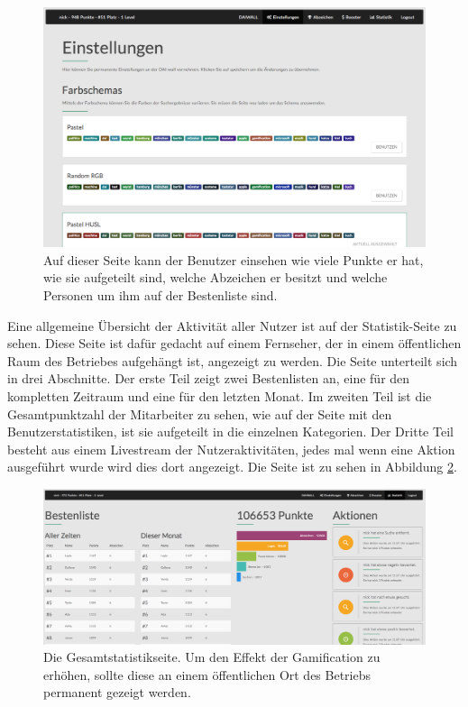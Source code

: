 \documentclass[12pt,twoside]{book}
\begin{document}
\begin{figure}[htbp]
    \centering
    \includegraphics[width=1.0\textwidth]{images/infoboard_settings.png}
    \caption{Auf dieser Seite kann der Benutzer einsehen wie viele Punkte er hat, wie sie aufgeteilt sind, welche Abzeichen er besitzt und welche Personen um ihm auf der Bestenliste sind.}
    \label{fig:settings}
\end{figure}

Eine allgemeine Übersicht der Aktivität aller Nutzer ist auf der Statistik-Seite zu sehen. Diese Seite ist dafür gedacht auf einem Fernseher, der in einem öffentlichen Raum des Betriebes aufgehängt ist, angezeigt zu werden. Die Seite unterteilt sich in drei Abschnitte. Der erste Teil zeigt zwei Bestenlisten an, eine für den kompletten Zeitraum und eine für den letzten Monat. Im zweiten Teil ist die Gesamtpunktzahl der Mitarbeiter zu sehen, wie auf der Seite mit den Benutzerstatistiken, ist sie aufgeteilt in die einzelnen Kategorien. Der Dritte Teil besteht aus einem Livestream der Nutzeraktivitäten, jedes mal wenn eine Aktion ausgeführt wurde wird dies dort angezeigt. Die Seite ist zu sehen in Abbildung \ref{fig:stats}.

\begin{figure}[htbp]
    \centering
    \includegraphics[width=1.0\textwidth]{images/infoboard_stats.png}
    \caption{Die Gesamtstatistikseite. Um den Effekt der Gamification zu erhöhen, sollte diese an einem öffentlichen Ort des Betriebs permanent gezeigt werden.}
    \label{fig:stats}
\end{figure}
\end{document}
